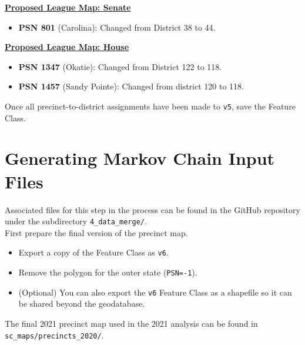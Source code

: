 \documentclass[11pt]{article}
\begin{document}
\underline{\textbf{Proposed League Map: Senate}}
\begin{itemize}
	\item \textbf{PSN 801} (Carolina): Changed from District 38 to 44.
\end{itemize}

\underline{\textbf{Proposed League Map: House}}
\begin{itemize}
	\item \textbf{PSN 1347} (Okatie): Changed from District 122 to 118.
	\item \textbf{PSN 1457} (Sandy Pointe): Changed from district 120 to 118.
\end{itemize}

Once all precinct-to-district assignments have been made to \verb|v5|, save the Feature Class.

\section{Generating Markov Chain Input Files}

Associated files for this step in the process can be found in the GitHub repository under the subdirectory \verb|4_data_merge/|.\\

First prepare the final version of the precinct map.
\begin{itemize}
\item Export a copy of the Feature Class as \verb|v6|.
\item Remove the polygon for the outer state (\verb|PSN=-1|).
\item (Optional) You can also export the \verb|v6| Feature Class as a shapefile so it can be shared beyond the geodatabase. 
\end{itemize}

The final 2021 precinct map used in the 2021 analysis can be found in \verb|sc_maps/precincts_2020/|.\\
\end{document}
